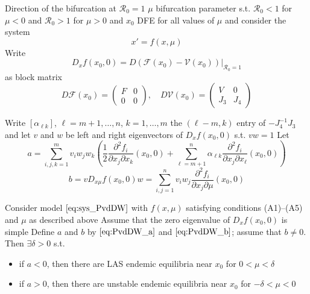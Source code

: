 \documentclass[aspectratio=169]{beamer}\usepackage[]{graphicx}\usepackage[]{xcolor}
\begin{document}
\begin{frame}{Direction of the bifurcation at $\mathcal{R}_0=1$}
$\mu$ bifurcation parameter s.t. $\mathcal{R}_0<1$ for $\mu<0$ and $\mathcal{R}_0>1$ for $\mu>0$ and $x_0$ DFE for all values of $\mu$ and consider the system
\begin{equation}
\label{eq:sys_PvdDW}
x'=f(x,\mu)
\end{equation}
\vfill
Write 
\[
D_xf(x_0,0)=
\left. 
  D(\mathcal{F}(x_0)-\mathcal{V}(x_0))
\right|_{\mathcal{R}_0=1}
\]
as block matrix
\[
D\mathcal{F}(x_0)
=\begin{pmatrix}
F & 0 \\ 0 & 0
\end{pmatrix},
\quad
D\mathcal{V}(x_0)
=\begin{pmatrix}
V & 0 \\ J_3 & J_4
\end{pmatrix}
\]
\end{frame}

\begin{frame}
Write $[\alpha_{\ell k}]$, $\ell=m+1,\ldots,n$, $k=1,\ldots,m$ the $(\ell-m,k)$ entry of $-J_4^{-1}J_3$ and let $v$ and $w$ be left and right eigenvectors of $D_xf(x_0,0)$ s.t. $vw=1$
\vfill
Let
\begin{equation}
\label{eq:PvdDW_a}
a =\sum_{i,j,k=1}^m
v_iw_jw_k
\left(
\frac 12 
\frac{\partial^2f_i}{\partial x_j\partial x_k}(x_0,0)
+\sum_{\ell=m+1}^n
\alpha_{\ell k}
\frac{\partial^2f_i}{\partial x_j\partial x_\ell}(x_0,0)
\right)
\end{equation}
\vfill
\begin{equation}
\label{eq:PvdDW_b}
b
=vD_{x\mu}f(x_0,0)w
=\sum_{i,j=1}^n v_iw_j
\frac{\partial^2f_i}{\partial x_j\partial\mu}
(x_0,0)
\end{equation}
\end{frame}

\begin{frame}
\begin{theorem}
Consider model $\eqref{eq:sys_PvdDW}$ with $f(x,\mu)$ satisfying conditions (A1)–(A5) and $\mu$ as described above
\vskip1cm
Assume that the zero eigenvalue of $D_xf(x_0,0)$ is simple
\vskip1cm
Define $a$ and $b$ by $\eqref{eq:PvdDW_a}$ and $\eqref{eq:PvdDW_b}$; assume that $b\neq 0$. Then $\exists\delta > 0$ s.t.
\begin{itemize}
\item if $a < 0$, then there are LAS endemic equilibria near $x_0$ for $0 < \mu < \delta$
\item if $a > 0$, then there are unstable endemic equilibria near $x_0$ for $-\delta < \mu < 0$
\end{itemize}
\end{theorem}
\end{frame}
\end{document}
